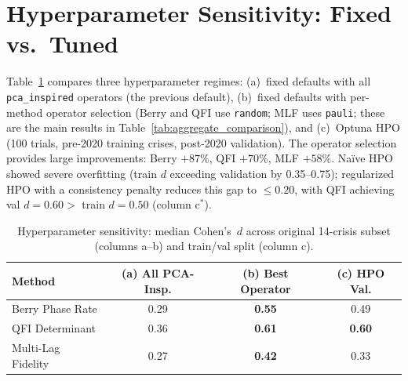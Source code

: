 \documentclass[3p]{elsarticle}
\begin{document}
\section{Hyperparameter Sensitivity: Fixed vs.\ Tuned}\label{sec:fixed_hp_ablation}

Table~\ref{tab:fixed_hp} compares three hyperparameter regimes:
(a)~fixed defaults with all \texttt{pca\_inspired} operators
(the previous default),
(b)~fixed defaults with per-method operator selection (Berry and
QFI use \texttt{random}; MLF uses \texttt{pauli}; these are
the main results in Table~\ref{tab:aggregate_comparison}), and (c)~Optuna
HPO (100 trials, pre-2020 training crises, post-2020 validation).
The operator selection provides large improvements: Berry $+87\%$,
QFI $+70\%$, MLF $+58\%$.
Na\"ive HPO showed
severe overfitting (train $d$ exceeding validation by 0.35--0.75);
regularized HPO with a consistency penalty reduces this gap to
$\leq 0.20$, with QFI achieving val $d = 0.60 >$ train $d = 0.50$
(column c$^*$).

\begin{table}[htb]
\centering
\caption{Hyperparameter sensitivity: median Cohen's~$d$ across
  original 14-crisis subset (columns a--b) and train/val split (column c).}
\label{tab:fixed_hp}
\small
\begin{tabular}{lccc}
\toprule
Method & (a) All PCA-Insp. & (b) Best Operator & (c) HPO Val. \\
\midrule
Berry Phase Rate & 0.29 & \textbf{0.55} & 0.49 \\
QFI Determinant           & 0.36 & \textbf{0.61} & \textbf{0.60} \\
Multi-Lag Fidelity        & 0.27 & \textbf{0.42} & 0.33 \\
\bottomrule
\end{tabular}

\medskip
{}
\end{table}
\end{document}
